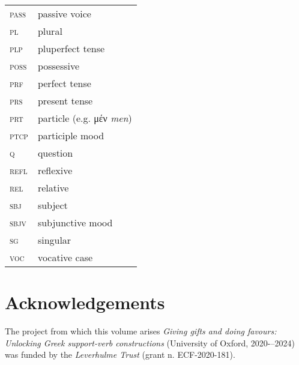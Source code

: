 \documentclass[output=paper,colorlinks,citecolor=brown]{langscibook}
\begin{document}
\begin{table}
\begin{tabularx}{.5\textwidth}{>{\hsize=0.5\hsize}X>{\hsize=1.5\hsize}X}
\textsc{pass} & passive voice \\
\textsc{pl} & plural \\
*\textsc{plp} & pluperfect tense \\
\textsc{poss} & possessive \\
\textsc{prf} & perfect tense \\
\textsc{prs} & present tense \\
*\textsc{prt} & particle (e.g. μέν \textit{men}) \\
\textsc{ptcp} & participle mood \\
\textsc{q} & question \\
\textsc{refl} & reflexive \\
\textsc{rel} & relative \\
\textsc{sbj} & subject \\
\textsc{sbjv} & subjunctive mood \\
\textsc{sg} & singular \\
\textsc{voc} & vocative case \\
\end{tabularx}%
\end{table}


\section*{Acknowledgements}
The project from which this volume arises \textit{Giving gifts and doing favours: Unlocking Greek support-verb constructions} (University of Oxford, 2020-–2024) was funded by the \textit{Leverhulme Trust} (grant n. ECF-2020-181).



{\sloppy\printbibliography[heading=subbibliography,notkeyword=this]}
\end{document}
